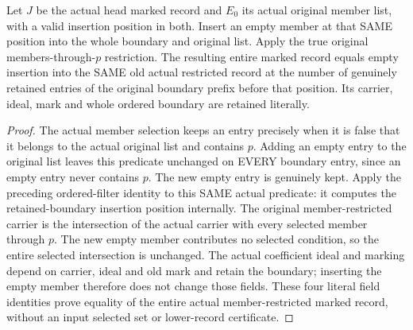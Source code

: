 \begin{lemma}
\label{hir:positive-member-empty-record}
\leanok
Let $J$ be the actual head marked record and $E_0$ its actual original member list, with a valid insertion position in both. Insert an empty member at that SAME position into the whole boundary and original list. Apply the true original members-through-$p$ restriction. The resulting entire marked record equals empty insertion into the SAME old actual restricted record at the number of genuinely retained entries of the original boundary prefix before that position. Its carrier, ideal, mark and whole ordered boundary are retained literally.
\end{lemma}
\begin{proof}
The actual member selection keeps an entry precisely when it is false that it belongs to the actual original list and contains $p$. Adding an empty entry to the original list leaves this predicate unchanged on EVERY boundary entry, since an empty entry never contains $p$. The new empty entry is genuinely kept. Apply the preceding ordered-filter identity to this SAME actual predicate: it computes the retained-boundary insertion position internally. The original member-restricted carrier is the intersection of the actual carrier with every selected member through $p$. The new empty member contributes no selected condition, so the entire selected intersection is unchanged. The actual coefficient ideal and marking depend on carrier, ideal and old mark and retain the boundary; inserting the empty member therefore does not change those fields. These four literal field identities prove equality of the entire actual member-restricted marked record, without an input selected set or lower-record certificate.
\end{proof}

